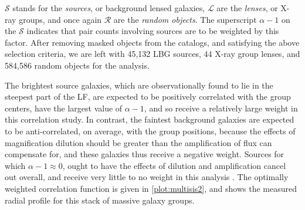 $\mathscr{S}$ stands for the {\it sources}, or background lensed galaxies, $\mathscr{L}$ are the {\it lenses}, or X-ray groups, and once again $\mathscr{R}$ are the {\it random objects}. The superscript $\alpha-1$ on the $\mathscr{S}$ indicates that pair counts involving sources are to be weighted by this factor.  After removing masked objects from the catalogs, and satisfying the above selection criteria, we are left with 45,132 \ac{LBG} sources, $44$ X-ray group lenses, and 584,586 random objects for the analysis.

\begin{table}
  \begin{center}


   \caption[Luminosity Function Parameters]{\ac{LF} (Schechter) parameters from external \ac{LBG} measurements. $^a$ \ac{LF} parameters from \protect \citet{vanderBurg10}. $^b$ \ac{LF} parameters from \protect \citet{Sawicki06}.}
 \label{LFtable2}
  \end{center}
\end{table}


The brightest source galaxies, which are observationally found to lie in the steepest part of the \ac{LF}, are expected to be positively correlated with the group centers, have the largest value of $\alpha-1$, and so receive a relatively large weight in this correlation study.  In contrast, the faintest background galaxies are expected to be anti-correlated, on average, with the group positions, because the effects of magnification dilution should be greater than the amplification of flux can compensate for, and these galaxies thus receive a negative weight.  Sources for which $\alpha-1 \approx 0$, ought to have the effects of dilution and amplification cancel out overall, and receive very little to no weight in this analysis \citep{Scranton05}. The optimally weighted correlation function is given in \autoref{plot:multisis2}, and shows the measured radial profile for this stack of massive galaxy groups.

